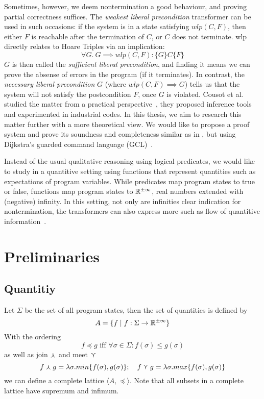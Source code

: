 \documentclass[adraft,hidelinks]{eptcs}
\begin{document}
Sometimes, however, we deem nontermination a good behaviour, and proving partial correctness suffices. 
The \textit{weakest liberal precondition} transformer \cite{Dijkstra1990} can be used in such occasions: 
if the system is in a state satisfying $wlp(C,F)$, then either $F$ is reachable after the termination of $C$, or $C$ does not terminate.
wlp directly relates to Hoare Triples via an implication: 
\[\forall G.\ G\implies wlp(C,F): \{G\} C \{F\}\]
$G$ is then called the \textit{sufficient liberal precondition}, and finding it means we can prove the absense of errors in the program (if it terminates). 
In contrast, the \textit{necessary liberal precondition} $G$ (where $ wlp(C,F)\implies G$) tells us that the system will not satisfy the postcondition $F$, once $G$ is violated. 
Cousot et al. studied the matter from a practical perspective~\cite{Cousot2013}, they proposed inference tools and experimented in industrial codes.
In this thesis, we aim to research this matter further with a more theoretical view. 
We would like to propose a proof system and prove its soundness and completeness similar as in \cite{Vries2011}, but using Dijkstra's guarded command language (GCL)~\cite{Dijkstra1975}. 

Instead of the usual qualitative reasoning using logical predicates, we would like to study in a quantitive setting using functions that represent quantities such as expectations of program variables. 
While predicates map program states to true or false, functions map program states to $\mathbb{R}^{\pm\infty}$, real numbers extended with (negative) infinity. 
In this setting, not only are infinities clear indication for nontermination, the transformers can also express more such as flow of quantitive information~\cite{Zhang2022}.


\section{Preliminaries}
\subsection{Quantitiy}
Let $\Sigma$ be the set of all program states, then the set of quantities is defined by 
\[A=\{f\mid f:\Sigma\to\mathbb{R}^{\pm\infty}\}\] 
With the ordering 
\[f\preceq g \text{ iff } \forall \sigma \in \Sigma: f(\sigma)\leq g(\sigma)\]
as well as join $\curlywedge$ and meet $\curlyvee$
\[f\curlywedge g = \lambda \sigma.min\{f(\sigma), g(\sigma)\}; \ \ \  f\curlyvee g = \lambda \sigma.max\{f(\sigma), g(\sigma) \}\]
we can define a complete lattice $\langle A, \preceq\rangle$. 
Note that all subsets in a complete lattice have supremum and infimum. 
\end{document}
